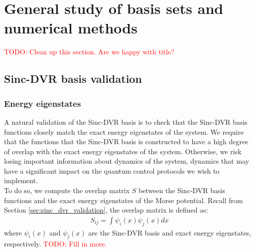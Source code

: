 \documentclass{subfiles}
\begin{document}
\section{General study of basis sets and numerical methods}\label{sec:general_study_results}
\textcolor{red}{TODO: Clean up this section. Are we happy with title?}
\subsection{Sinc-DVR basis validation}
\subsubsection*{Energy eigenstates}
A natural validation of the Sinc-DVR basis is to check that the Sinc-DVR basis functions closely match the exact energy eigenstates of the system. We require that the functions that the Sinc-DVR basis is constructed to have a high degree of overlap with the exact energy eigenstates of the system. Otherwise, we risk losing important information about dynamics of the system, dynamics that may have a significant impact on the quantum control protocols we wish to implement.\\ 

To do so, we compute the overlap matrix $S$ between the Sinc-DVR basis functions and the exact energy eigenstates of the Morse potential. Recall from Section \ref{sec:sinc_dvr_validation}, the overlap matrix is defined as:
\begin{align*}
    S_{ij} = \int \psi_i(x) \psi_j(x) dx
\end{align*}
where $\psi_i(x)$ and $\psi_j(x)$ are the Sinc-DVR basis and exact energy eigenstates, respectively. \textcolor{red}{TODO: Fill in more.}
\end{document}
